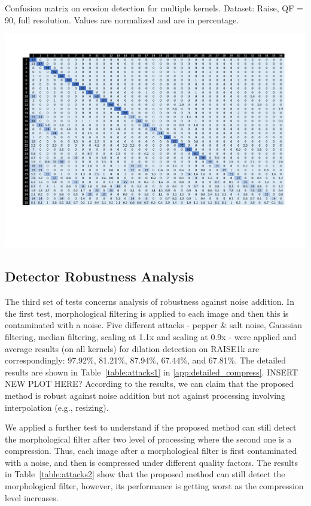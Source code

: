 \documentclass[review]{elsarticle}
\begin{document}
\begin{table}
	\centering
	\caption{Confusion matrix on erosion detection for multiple kernels. Dataset: Raise, QF = 90, full resolution. Values are normalized and are in percentage.}
	\label{table:confusion}
	\includegraphics[width=\linewidth]{confusion}
\end{table}

\subsection{Detector Robustness Analysis}
\label{subsec:result_attacks}

The third set of tests concerns analysis of robustness against noise addition. In the first test, morphological filtering is applied to each image and then this is contaminated with a noise. Five different attacks - pepper \& salt noise, Gaussian filtering, median filtering, scaling at 1.1x and scaling at 0.9x - were applied and average results (on all kernels) for dilation detection on RAISE1k are correspondingly: 97.92\%, 81.21\%, 87.94\%, 67.44\%, and 67.81\%. The detailed results are shown in Table~\ref{table:attacks1} in \ref{app:detailed_compress}. INSERT NEW PLOT HERE? According to the results, we can claim that the proposed method is robust against noise addition but not against processing involving interpolation (e.g., resizing). 

We applied a further test to understand if the proposed method can still detect the morphological filter after two level of processing where the second one is a compression. Thus, each image after a morphological filter is first contaminated with a noise, and then is compressed under different quality factors.  The results in Table~\ref{table:attacks2} show that the proposed method can still detect the morphological filter, however, its performance is getting worst as the compression level increases.  
\end{document}
